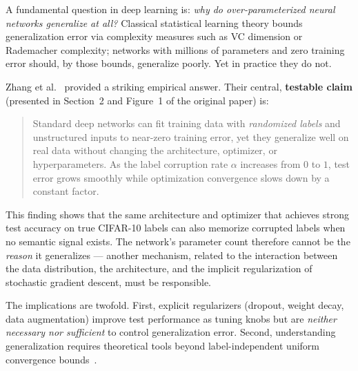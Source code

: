\documentclass[12pt,a4paper]{article}
\newif\ifshowguides
\newcommand{\guide}[1]{%
  \ifshowguides
    \begin{tcolorbox}[colframe=blue!60,colback=blue!5,
                      title={\small\textbf{Instructor Guide}},
                      fonttitle=\small\bfseries]
      {\small\textit{Guide: }#1}
    \end{tcolorbox}
  \fi
}
\theoremstyle{definition}
\theoremstyle{remark}
\begin{document}
\guide{%
  The introduction should (1)~motivate the research question, (2)~state the
  exact testable claim of the reproduced paper, (3)~explain \emph{why} the
  claim is surprising, (4)~outline the structure of the remainder of the
  report. Cite the original paper and any directly relevant background.
  Aim for 300--500 words.
}

A fundamental question in deep learning is: \emph{why do over-parameterized
neural networks generalize at all?} Classical statistical learning theory
bounds generalization error via complexity measures such as VC dimension or
Rademacher complexity; networks with millions of parameters and zero
training error should, by those bounds, generalize poorly. Yet in practice
they do not.

Zhang et al.~\cite{zhang2017understanding} provided a striking empirical
answer. Their central, \textbf{testable claim} (presented in Section~2 and
Figure~1 of the original paper) is:

\begin{quote}
  Standard deep networks can fit training data with \emph{randomized labels}
  and unstructured inputs to near-zero training error, yet they generalize well
  on real data without changing the architecture, optimizer, or hyperparameters.
  As the label corruption rate $\alpha$ increases from $0$ to $1$, test error
  grows smoothly while optimization convergence slows down by a constant factor.
\end{quote}

This finding shows that the same architecture and optimizer that achieves
strong test accuracy on true CIFAR-10 labels can also memorize corrupted
labels when no semantic signal exists. The network's parameter count therefore
cannot be the \emph{reason} it generalizes --- another mechanism, related to the
interaction between the data distribution, the architecture, and the implicit
regularization of stochastic gradient descent, must be responsible.

The implications are twofold. First, explicit regularizers (dropout, weight
decay, data augmentation) improve test performance as tuning knobs but are
\emph{neither necessary nor sufficient} to control generalization error.
Second, understanding generalization requires theoretical tools beyond
label-independent uniform convergence bounds~\cite{goodfellow2016deep}.
\end{document}
